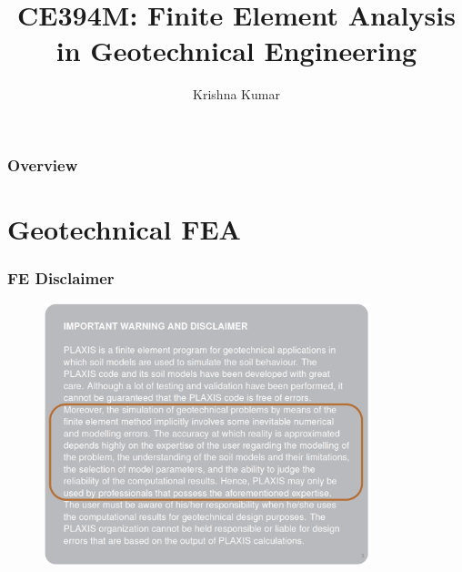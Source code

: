 \documentclass[notes]{beamer}
\title[CE394M: FEM Geo]{CE394M: Finite Element Analysis in Geotechnical Engineering}
\author{Krishna Kumar} %
\institute[UT Austin] %
{
University of Texas at Austin \\
\medskip
\textit{
  \url{krishnak@utexas.edu}} %
}
\date{} %
\begin{document}
\begin{frame}
\titlepage %
\end{frame}

\begin{frame}
 \frametitle{Overview}
 \tableofcontents
\end{frame}

\section{Geotechnical FEA}
\begin{frame}
\frametitle{FE Disclaimer}
\begin{figure}[ht]
	\centering
	\includegraphics[width=0.85\textwidth]{figs/plaxis-disclaimer.png}
\end{figure}
\end{frame}
\end{document}
